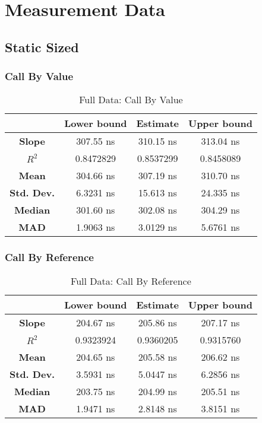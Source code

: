 \section{Measurement Data}

\subsection{Static Sized}

\subsubsection{Call By Value}
\begin{table}[H]
\centering
\begin{tabular}{|c|c|c|c|}
\hline
\textbf{} & \textbf{Lower bound} & \textbf{Estimate} & \textbf{Upper bound} \\
\hline
\textbf{Slope} & 307.55 ns & 310.15 ns & 313.04 ns \\
\hline
\textbf{$R^2$} & 0.8472829 & 0.8537299 & 0.8458089 \\
\hline
\textbf{Mean} & 304.66 ns & 307.19 ns & 310.70 ns \\
\hline
\textbf{Std. Dev.} & 6.3231 ns & 15.613 ns & 24.335 ns \\
\hline
\textbf{Median} & 301.60 ns & 302.08 ns & 304.29 ns \\
\hline
\textbf{MAD} & 1.9063 ns & 3.0129 ns & 5.6761 ns \\
\hline
\end{tabular}
\caption{Full Data: Call By Value}
\end{table}


\subsubsection{Call By Reference}
\begin{table}[H]
\centering
\begin{tabular}{|c|c|c|c|}
\hline
 & \textbf{Lower bound} & \textbf{Estimate} & \textbf{Upper bound} \\
\hline
\textbf{Slope} & 204.67 ns & 205.86 ns & 207.17 ns \\
\hline
\textbf{$R^2$} & 0.9323924 & 0.9360205 & 0.9315760 \\
\hline
\textbf{Mean} & 204.65 ns & 205.58 ns & 206.62 ns \\
\hline
\textbf{Std. Dev.} & 3.5931 ns & 5.0447 ns & 6.2856 ns \\
\hline
\textbf{Median} & 203.75 ns & 204.99 ns & 205.51 ns \\
\hline
\textbf{MAD} & 1.9471 ns & 2.8148 ns & 3.8151 ns \\
\hline
\end{tabular}
\caption{Full Data: Call By Reference}
\end{table}

